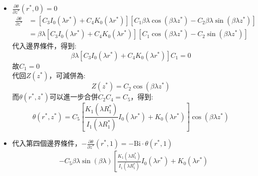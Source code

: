\documentclass[../main.tex]{subfiles}
\begin{document}
\begin{itemize}
\begin{itemize}
\begin{equation}
        C_3 \lambda I_1(\lambda R_1^\ast) - C_4 \lambda K_1(\lambda R_1^\ast) = 0
      \end{equation}
      解得:
      \begin{equation}
        C_3 = \frac{C_4 K_1(\lambda R_1^\ast)}{I_1(\lambda R_1^\ast)}
      \end{equation}
      代回$R(r^\ast)$，可減併為:
      \begin{equation}
        R(r^\ast) = C_4 \left[
          \frac{K_1(\lambda R_1^\ast)}{I_1(\lambda R_1^\ast)} I_0(\lambda r^\ast) + K_0(\lambda r^\ast)
        \right]
      \end{equation}
      \item $\frac{\partial \theta}{\partial z^\ast}(r^\ast,0) = 0$
      \begin{align}
        \frac{\partial \theta}{\partial z^\ast} &= \left[
          C_3 I_0(\lambda r^\ast) + C_4 K_0(\lambda r^\ast)
        \right] \left[
          C_1 \beta \lambda \cos(\beta \lambda z^\ast) - C_2 \beta \lambda \sin(\beta \lambda z^\ast)
        \right] \nonumber\\
        & = \beta \lambda \left[
          C_3 I_0(\lambda r^\ast) + C_4 K_0(\lambda r^\ast)
        \right] \left[
          C_1 \cos(\beta \lambda z^\ast) - C_2 \sin(\beta \lambda z^\ast)
        \right]
      \end{align}
      代入邊界條件，得到:
      \begin{equation}
        \beta \lambda \left[
          C_3 I_0(\lambda r^\ast) + C_4 K_0(\lambda r^\ast)
        \right] C_1 = 0
      \end{equation}
      故$C_1=0$\\
      代回$Z(z^\ast)$，可減併為:
      \begin{equation}
        Z(z^\ast) = C_2 \cos(\beta \lambda z^\ast)
      \end{equation}
      而$\theta(r^\ast, z^\ast)$可以進一步合併$C_2 C_4 = C_5$，得到:
      \begin{equation}
        \theta(r^\ast, z^\ast) = C_5 \left[
          \frac{K_1(\lambda R_1^\ast)}{I_1(\lambda R_1^\ast)} I_0(\lambda r^\ast) + K_0(\lambda r^\ast)
        \right] \cos(\beta \lambda z^\ast)
      \end{equation}
      \item 代入第四個邊界條件，$-\frac{\partial \theta}{\partial z^\ast}(r^\ast, 1) = -\text{Bi} \cdot \theta(r^\ast, 1)$
      \begin{align}
        & -C_5 \beta \lambda\sin(\beta \lambda)\left[
          \frac{K_1(\lambda R_1^\ast)}{I_1(\lambda R_1^\ast)} I_0(\lambda r^\ast) + K_0(\lambda r^\ast)

\end{align}
\end{itemize}
\end{itemize}
\end{document}
